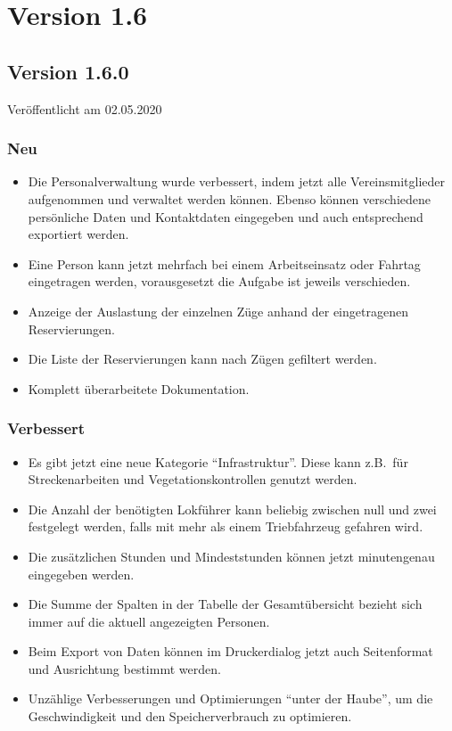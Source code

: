 \section{Version 1.6}\label{version:1:6}
\subsection{Version 1.6.0}
\label{version:1:6:0}
Veröffentlicht am 02.05.2020
\subsubsection{Neu}
\begin{itemize}
  \item
  Die Personalverwaltung wurde verbessert, indem jetzt alle Vereinsmitglieder aufgenommen und verwaltet werden können.
  Ebenso können verschiedene persönliche Daten und Kontaktdaten eingegeben und auch entsprechend exportiert werden.
  \item
  Eine Person kann jetzt mehrfach bei einem Arbeitseinsatz oder Fahrtag eingetragen werden,
  vorausgesetzt die Aufgabe ist jeweils verschieden.
  \item
  Anzeige der Auslastung der einzelnen Züge anhand der eingetragenen Reservierungen.
  \item
  Die Liste der Reservierungen kann nach Zügen gefiltert werden.
  \item
  Komplett überarbeitete Dokumentation.
\end{itemize}

\subsubsection{Verbessert}
\begin{itemize}
  \item
  Es gibt jetzt eine neue Kategorie "`Infrastruktur"'.
  Diese kann z.B.\ für Streckenarbeiten und Vegetationskontrollen genutzt werden.
  \item
  Die Anzahl der benötigten Lokführer kann beliebig zwischen null und zwei festgelegt werden,
  falls mit mehr als einem Triebfahrzeug gefahren wird.
  \item
  Die zusätzlichen Stunden und Mindeststunden können jetzt minutengenau eingegeben werden.
  \item
  Die Summe der Spalten in der Tabelle der Gesamtübersicht bezieht sich immer auf die aktuell angezeigten Personen.
  \item
  Beim Export von Daten können im Druckerdialog jetzt auch Seitenformat und Ausrichtung bestimmt werden.
  \item
  Unzählige Verbesserungen und Optimierungen "`unter der Haube"', um die Geschwindigkeit und den Speicherverbrauch zu optimieren.
\end{itemize}

